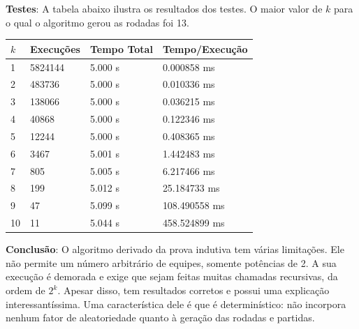 \documentclass{article}
\begin{document}
\textbf{Testes}: A tabela abaixo ilustra os resultados dos testes. O maior valor de $k$ para o qual o algoritmo gerou as rodadas foi 13.

\begin{table}[H]
\centering
\begin{tabular}{l|l|l|l}
$k$ & Execuções & Tempo Total & Tempo/Execução \\\hline
1 & 5824144 & 5.000 s & 0.000858 ms \\
2 & 483736 & 5.000 s & 0.010336 ms \\
3 & 138066 & 5.000 s & 0.036215 ms \\
4 & 40868 & 5.000 s & 0.122346 ms \\
5 & 12244 & 5.000 s & 0.408365 ms \\
6 & 3467 & 5.001 s & 1.442483 ms \\
7 & 805 & 5.005 s & 6.217466 ms \\
8 & 199 & 5.012 s & 25.184733 ms \\
9 & 47 & 5.099 s & 108.490558 ms \\
10 & 11 & 5.044 s & 458.524899 ms \\
\end{tabular}
\end{table}

\textbf{Conclusão}: O algoritmo derivado da prova indutiva tem várias limitações. Ele não permite um número arbitrário de equipes, somente potências de 2. A sua execução é demorada e exige que sejam feitas muitas chamadas recursivas, da ordem de $2^k$. Apesar disso, tem resultados corretos e possui uma explicação interessantíssima. Uma característica dele é que é determinístico: não incorpora nenhum fator de aleatoriedade quanto à geração das rodadas e partidas.
\end{document}
